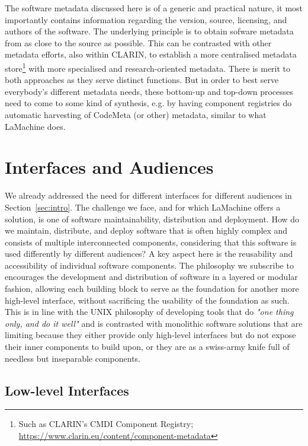 \documentclass[a4paper,11pt]{article}
\begin{document}
The software metadata discussed here is of a generic and practical nature, it most importantly contains information regarding the version, source,
licensing, and authors of the software. The underlying principle is to obtain sofware metadata from as close to the
source as possible. This can be contrasted with other metadata efforts, also within CLARIN, to establish a more
centralised metadata store\footnote{Such as CLARIN's CMDI Component Registry;
\url{https://www.clarin.eu/content/component-metadata}} with more specialised and
research-oriented metadata. There is merit to both approaches as they serve distinct functions. But in order to best
serve everybody's different metadata needs, these bottom-up and top-down processes need to come to some kind of
synthesis, e.g. by having component registries do automatic harvesting of CodeMeta (or other) metadata, similar to what LaMachine
does.

\FloatBarrier



\section{Interfaces and Audiences}

We already addressed the need for different interfaces for different audiences in Section~\ref{sec:intro}. The challenge we
face, and for which LaMachine offers a solution, is one of software maintainability, distribution and deployment. How do
we maintain, distribute, and deploy software that is often highly complex and consists of multiple interconnected components, considering
that this software is used differently by different audiences? A key aspect here is the reusability and accessibility of individual
software components. The philosophy we subscribe to encourages the development and distribution of software in a layered or modular fashion,
allowing each building block to serve as the foundation for another more high-level interface, without sacrificing the usability of the
foundation as such. This is in line with the UNIX philosophy of developing tools that do \emph{"one thing only, and do
it well"} and is contrasted with monolithic software solutions that are limiting because they either provide only high-level interfaces but do not
expose their inner components to build upon, or they are as a swiss-army knife full of needless but inseparable
components.

\subsection{Low-level Interfaces}
\end{document}

